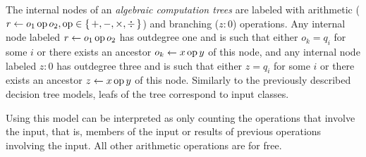 The internal nodes of an \emph{algebraic computation trees} are labeled with
arithmetic (\(r \gets o_1 \operatorname{op} o_2, \operatorname{op} \in \{\,+,-,\times,\div\,\}\)) and
branching (\(z : 0\)) operations. Any internal node labeled \(r \gets o_1 \operatorname{op}
o_2\) has outdegree one and is
such that either \(o_k = q_i\) for some \(i\) or there exists an ancestor \(o_k
\gets x \operatorname{op} y\) of this node, and any internal node labeled \(z : 0\) has
outdegree three and is such that either \(z = q_i\) for some \(i\) or there
exists an ancestor \(z \gets x \operatorname{op} y\) of this node.
Similarly to the previously described decision tree models, leafs of the tree
correspond to input classes.

Using this model can be interpreted as only counting the operations that
involve the input, that is, members of the input or results of previous
operations involving the input. All other arithmetic operations are for free.

